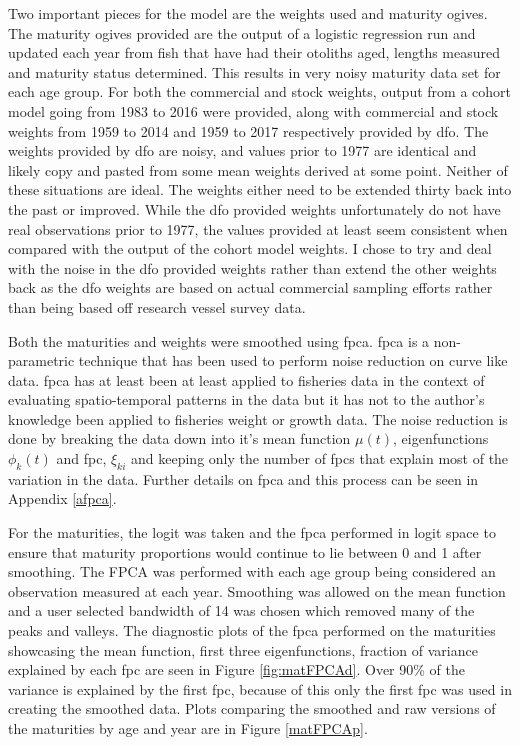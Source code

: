 \documentclass[11pt]{article}\usepackage[]{graphicx}\usepackage[]{color}
\begin{document}
Two important pieces for the model are the weights used and maturity ogives. The maturity ogives provided are the output of a logistic regression run and updated each year from fish that have had their otoliths aged, lengths measured and maturity status determined. This results in very noisy maturity data set for each age group. For both the commercial and stock weights, output from a cohort model going from 1983 to 2016 were provided, along with commercial and stock weights from 1959 to 2014 and 1959 to 2017 respectively provided by \acrshort{dfo}. The weights provided by \acrshort{dfo} are noisy, and values prior to 1977 are identical and likely copy and pasted from some mean weights derived at some point. Neither of these situations are ideal. The weights either need to be extended thirty back into the past or improved. While the \acrshort{dfo} provided weights unfortunately do not have real observations prior to 1977, the values provided at least seem consistent when compared with the output of the cohort model weights. I chose to try and deal with the noise in the \acrshort{dfo} provided weights rather than extend the other weights back as the \acrshort{dfo} weights are based on actual commercial sampling efforts rather than being based off research vessel survey data.

Both the maturities and weights were smoothed using \acrfull{fpca}. \acrshort{fpca} is a non-parametric technique that has been used to perform noise reduction on curve like data\cite{ramsay2007applied}. \acrshort{fpca} has at least been at least applied to fisheries data in the context of evaluating spatio-temporal patterns in the data\cite{embling_2012} but it has not to the author's knowledge been applied to fisheries weight or growth data. The noise reduction is done by breaking the data down into it's mean function $\mu(t)$, eigenfunctions $\phi_k(t)$ and \acrfull{fpc}, $\xi_{ki}$ and keeping only the number of \acrshort{fpc}s that explain most of the variation in the data.  Further details on \acrshort{fpca} and this process can be seen in Appendix \ref{afpca}.

For the maturities, the logit was taken and the \acrshort{fpca} performed in logit space to ensure that maturity proportions would continue to lie between 0 and 1 after smoothing. The FPCA was performed with each age group being considered an observation measured at each year. Smoothing was allowed on the mean function and a user selected bandwidth of 14 was chosen which removed many of the peaks and valleys. The diagnostic plots of the \acrshort{fpca} performed on the maturities showcasing the mean function, first three eigenfunctions, fraction of variance explained by each \acrshort{fpc} are seen in Figure \ref{fig:matFPCAd}. Over 90\% of the variance is explained by the first \acrshort{fpc}, because of this only the first \acrshort{fpc} was used in creating the smoothed data. Plots comparing the smoothed and raw versions of the maturities by age and year are in Figure \ref{matFPCAp}.
\end{document}
